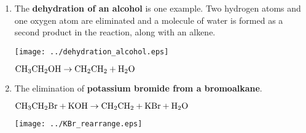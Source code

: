 \begin{enumerate}
\item{
The \textbf{dehydration of an alcohol} is one example. Two hydrogen atoms and one oxygen atom are eliminated and a molecule of water is formed as a second product in the reaction, along with an alkene. \\

\begin{center}
\texttt{[image: ../dehydration\_alcohol.eps]}
\end{center}


\begin{center}
$\rm{CH_{3}CH_{2}OH \rightarrow CH_{2}CH_{2} + H_{2}O}$
\end{center}

%
}

\item{The elimination of \textbf{potassium bromide from a bromoalkane}.

\begin{center}
$\rm{CH_{3}CH_{2}Br + KOH \rightarrow CH_{2}CH_{2} + KBr + H_{2}O}$
\end{center}

\begin{center}
\texttt{[image: ../KBr\_rearrange.eps]}
\end{center}


}
\end{enumerate}
